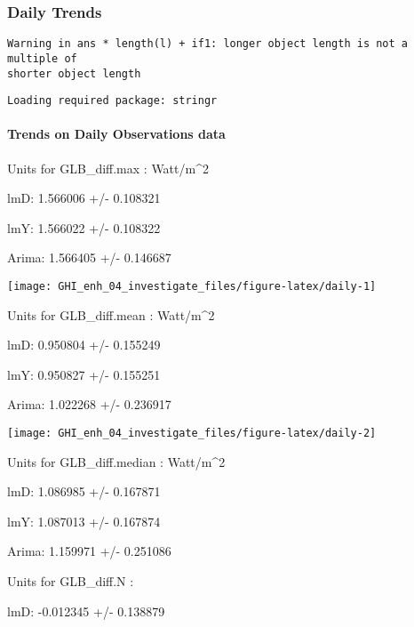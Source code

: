 \documentclass[
  10pt,
  a4paper,oneside]{article}
\begin{document}
\newpage
\FloatBarrier

\hypertarget{daily-trends}{%
\subsubsection{Daily Trends}\label{daily-trends}}

\begin{verbatim}
Warning in ans * length(l) + if1: longer object length is not a multiple of
shorter object length
\end{verbatim}

\newpage

\begin{verbatim}
Loading required package: stringr
\end{verbatim}

\hypertarget{trends-on-daily-observations-data}{%
\paragraph{Trends on Daily Observations data}\label{trends-on-daily-observations-data}}

Units for GLB\_diff.max : Watt/m\^{}2

lmD: 1.566006 +/- 0.108321

lmY: 1.566022 +/- 0.108322

Arima: 1.566405 +/- 0.146687

\begin{center}\texttt{[image: GHI\_enh\_04\_investigate\_files/figure-latex/daily-1]} \end{center}

Units for GLB\_diff.mean : Watt/m\^{}2

lmD: 0.950804 +/- 0.155249

lmY: 0.950827 +/- 0.155251

Arima: 1.022268 +/- 0.236917

\begin{center}\texttt{[image: GHI\_enh\_04\_investigate\_files/figure-latex/daily-2]} \end{center}

Units for GLB\_diff.median : Watt/m\^{}2

lmD: 1.086985 +/- 0.167871

lmY: 1.087013 +/- 0.167874

Arima: 1.159971 +/- 0.251086

Units for GLB\_diff.N :

lmD: -0.012345 +/- 0.138879
\end{document}
